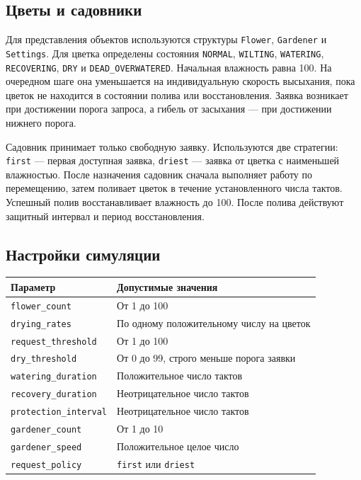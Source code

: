 \documentclass[12pt,a4paper]{article}
\begin{document}
\subsection{Цветы и садовники}
Для представления объектов используются структуры \texttt{Flower}, \texttt{Gardener} и \texttt{Settings}. Для цветка определены состояния \texttt{NORMAL}, \texttt{WILTING}, \texttt{WATERING}, \texttt{RECOVERING}, \texttt{DRY} и \texttt{DEAD\_}\allowbreak\texttt{OVERWATERED}. Начальная влажность равна 100. На очередном шаге она уменьшается на индивидуальную скорость высыхания, пока цветок не находится в состоянии полива или восстановления. Заявка возникает при достижении порога запроса, а гибель от засыхания --- при достижении нижнего порога.

Садовник принимает только свободную заявку. Используются две стратегии: \texttt{first} --- первая доступная заявка, \texttt{driest} --- заявка от цветка с наименьшей влажностью. После назначения садовник сначала выполняет работу по перемещению, затем поливает цветок в течение установленного числа тактов. Успешный полив восстанавливает влажность до 100. После полива действуют защитный интервал и период восстановления.

\subsection{Настройки симуляции}
\begin{longtable}{|p{}|p{}|}
\hline
Параметр & Допустимые значения\\ \hline
\endhead
\texttt{flower\_count} & От 1 до 100\\ \hline
\texttt{drying\_rates} & По одному положительному числу на цветок\\ \hline
\texttt{request\_threshold} & От 1 до 100\\ \hline
\texttt{dry\_threshold} & От 0 до 99, строго меньше порога заявки\\ \hline
\texttt{watering\_duration} & Положительное число тактов\\ \hline
\texttt{recovery\_duration} & Неотрицательное число тактов\\ \hline
\texttt{protection\_interval} & Неотрицательное число тактов\\ \hline
\texttt{gardener\_count} & От 1 до 10\\ \hline
\texttt{gardener\_speed} & Положительное целое число\\ \hline
\texttt{request\_policy} & \texttt{first} или \texttt{driest}\\ \hline
\end{longtable}
\end{document}
